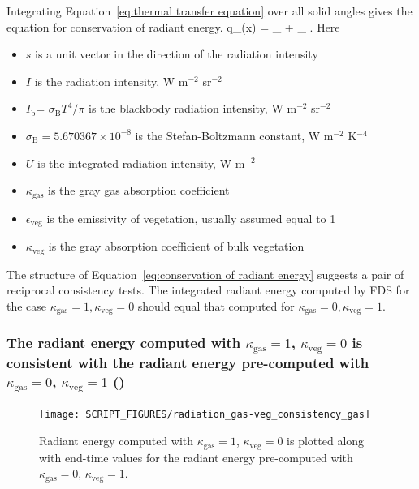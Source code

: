 \documentclass[11pt]{book}
\begin{document}
Integrating Equation~\ref{eq:thermal transfer equation} over all solid
angles gives the equation for conservation of radiant energy.
\be
\nabla \cdot q_{}(x) = \kappa_{}  +
\kappa_{} .
\label{eq:conservation of radiant energy}
\ee
Here
\begin{itemize}
 \item $s$ is a unit vector in the direction of the radiation intensity
 \item $I$ is the radiation intensity, W m$^{-2}$ sr$^{-2}$
 \item $I_{\mathrm{b}}$= $\sigma_{\mathrm{B}} T^4/\pi$ is the blackbody radiation intensity, W m$^{-2}$ sr$^{-2}$
 \item $\sigma_{\mathrm{B}} = 5.670367 \times 10^{−8}$  is the
   Stefan-Boltzmann constant, W m$^{−2}$ K$^{−4}$
 \item $U$ is the integrated radiation intensity, W m$^{-2}$
 \item $\kappa_{\mathrm{gas}}$ is the gray gas absorption coefficient
 \item $\epsilon_{\mathrm{veg}}$ is the emissivity of vegetation, usually
   assumed equal to 1
 \item $\kappa_{\mathrm{veg}}$ is the gray absorption coefficient of bulk vegetation
\end{itemize}
The structure of Equation~\ref{eq:conservation of radiant energy}
suggests a pair of reciprocal consistency tests.  The integrated radiant energy
computed by FDS for the case $\kappa_{\mathrm{gas}} = 1, \kappa_{\mathrm{veg}} = 0$ should equal that computed for
$\kappa_{\mathrm{gas}} = 0, \kappa_{\mathrm{veg}} = 1$.

\subsubsection{The radiant energy computed with $\kappa_{\mathrm{gas}}
  = 1$, $\kappa_{\mathrm{veg}} = 0$ is consistent with
 the radiant energy pre-computed with $\kappa_{\mathrm{gas}} = 0$,
$\kappa_{\mathrm{veg}} = 1$ (\texorpdfstring{}{radiation\_gas-veg\_consistency\_gas})}
\label{radiation_gas-veg_consistency_gas}

\begin{figure}[ht]
\centering
\texttt{[image: SCRIPT\_FIGURES/radiation\_gas-veg\_consistency\_gas]}
\caption[
test case.]{Radiant energy computed with $\kappa_{\mathrm{gas}}
  = 1$, $\kappa_{\mathrm{veg}} = 0$ is plotted along with end-time values
  for the radiant energy pre-computed with  $\kappa_{\mathrm{gas}} = 0$,
$\kappa_{\mathrm{veg}} = 1$.}
\label{fig_radiation_gas-veg_consistency_gas}
\end{figure}
\end{document}
